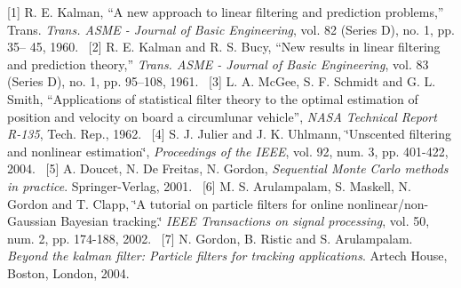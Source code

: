  \mbox{[}1\mbox{]} R. E. Kalman, “A new approach to linear filtering and prediction problems,” Trans. {\itshape Trans. A\+S\+ME -\/ Journal of Basic Engineering}, vol. 82 (Series D), no. 1, pp. 35– 45, 1960.~\newline
 \mbox{[}2\mbox{]} R. E. Kalman and R. S. Bucy, “\+New results in linear filtering and prediction theory,” {\itshape Trans. A\+S\+ME -\/ Journal of Basic Engineering}, vol. 83 (Series D), no. 1, pp. 95–108, 1961.~\newline
 \mbox{[}3\mbox{]} L. A. Mc\+Gee, S. F. Schmidt and G. L. Smith, “\+Applications of statistical filter theory to the optimal estimation of position and velocity on board a circumlunar vehicle”, {\itshape N\+A\+SA Technical Report R-\/135}, Tech. Rep., 1962.~\newline
 \mbox{[}4\mbox{]} S. J. Julier and J. K. Uhlmann, \char`\"{}\+Unscented filtering and nonlinear estimation\char`\"{}, {\itshape Proceedings of the I\+E\+EE}, vol. 92, num. 3, pp. 401-\/422, 2004.~\newline
 \mbox{[}5\mbox{]} A. Doucet, N. De Freitas, N. Gordon, {\itshape Sequential Monte Carlo methods in practice}. Springer-\/\+Verlag, 2001.~\newline
 \mbox{[}6\mbox{]} M. S. Arulampalam, S. Maskell, N. Gordon and T. Clapp, \char`\"{}\+A tutorial on particle filters for online nonlinear/non-\/\+Gaussian Bayesian tracking.\char`\"{} {\itshape I\+E\+EE Transactions on signal processing}, vol. 50, num. 2, pp. 174-\/188, 2002.~\newline
 \mbox{[}7\mbox{]} N. Gordon, B. Ristic and S. Arulampalam. {\itshape Beyond the kalman filter\+: Particle filters for tracking applications}. Artech House, Boston, London, 2004.~\newline
 